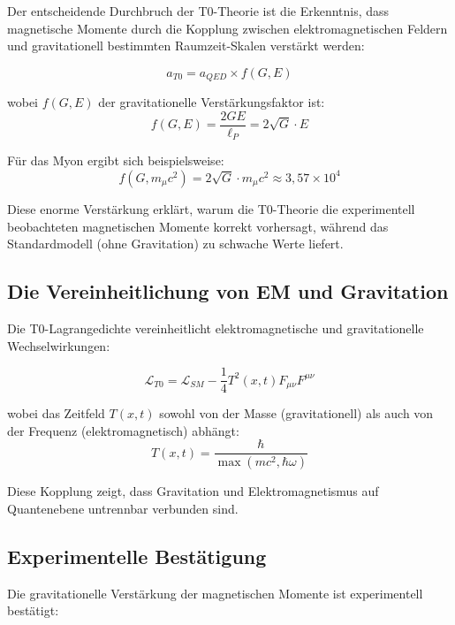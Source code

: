 \documentclass[12pt,a4paper]{article}
\theoremstyle{definition}
\begin{document}
	Der entscheidende Durchbruch der T0-Theorie ist die Erkenntnis, dass magnetische Momente durch die Kopplung zwischen elektromagnetischen Feldern und gravitationell bestimmten Raumzeit-Skalen verstärkt werden:
	
	\begin{equation}
		a_{T0} = a_{QED} \times f(G, E)
	\end{equation}
	
	wobei $f(G, E)$ der gravitationelle Verstärkungsfaktor ist:
	\begin{equation}
		f(G, E) = \frac{2GE}{\ell_P} = 2\sqrt{G} \cdot E
	\end{equation}
	
	Für das Myon ergibt sich beispielsweise:
	\begin{equation}
		f(G, m_\mu c^2) = 2\sqrt{G} \cdot m_\mu c^2 \approx 3{,}57 \times 10^4
	\end{equation}
	
	Diese enorme Verstärkung erklärt, warum die T0-Theorie die experimentell beobachteten magnetischen Momente korrekt vorhersagt, während das Standardmodell (ohne Gravitation) zu schwache Werte liefert.
	
	\subsection{Die Vereinheitlichung von EM und Gravitation}
	
	Die T0-Lagrangedichte vereinheitlicht elektromagnetische und gravitationelle Wechselwirkungen:
	
	\begin{equation}
		\mathcal{L}_{T0} = \mathcal{L}_{SM} - \frac{1}{4}T^2(x,t) F_{\mu\nu} F^{\mu\nu}
	\end{equation}
	
	wobei das Zeitfeld $T(x,t)$ sowohl von der Masse (gravitationell) als auch von der Frequenz (elektromagnetisch) abhängt:
	\begin{equation}
		T(x,t) = \frac{\hbar}{\max(mc^2, \hbar\omega)}
	\end{equation}
	
	Diese Kopplung zeigt, dass Gravitation und Elektromagnetismus auf Quantenebene untrennbar verbunden sind.
	
	\subsection{Experimentelle Bestätigung}
	
	Die gravitationelle Verstärkung der magnetischen Momente ist experimentell bestätigt:
	
\end{document}

